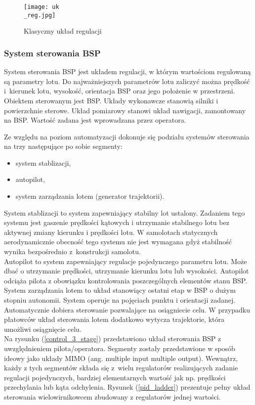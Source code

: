 \begin{figure}[!h]
   	\centering
      	\texttt{[image: uk\\\_reg.jpg]}
      	\caption{Klasyczny układ regulacji}
      	\label{reg}
\end{figure}

\subsubsection{System sterowania BSP}
System sterowania BSP jest układem regulacji, w którym wartościom regulowaną są parametry lotu. Do najważniejszych parametrów lotu zaliczyć można prędkość i~kierunek lotu, wysokość, orientacja BSP oraz jego położenie w przestrzeni. Obiektem sterowanym jest BSP. Układy wykonawcze stanowią silniki i powierzchnie sterowe. Układ pomiarowy stanowi układ nawigacji, zamontowany na BSP. Wartość zadana jest wprowadzana przez operatora.

 Ze względu na poziom automatyzacji dokonuje się podziału systemów sterowania na trzy następujące po sobie segmenty:
\begin{itemize}
\item system stablizacji,
\item autopilot,
\item system zarządzania lotem (generator trajektorii).
\end{itemize}
System stablizacji to system zapewniający stabilny lot ustalony. Zadaniem tego systemu jest gaszenie prędkości kątowych i utrzymanie stabilnego lotu bez aktywnej zmiany kierunku i prędkości lotu. W samolotach statycznych aerodynamicznie obecność tego systemu nie jest wymagana gdyż stabilność wynika bezpośrednio z~konstrukcji samolotu.\\

Autopilot to system zapewniający regulacje pojedynczego parametru lotu. Może dbać o utrzymanie prędkości, utrzymanie kierunku lotu lub wysokości. Autopilot odciąża pilota z obowiązku kontrolowania poszczególnych elementów stanu BSP.\\

System zarządzania lotem to układ stanowiący ostatni etap w BSP o dużym stopniu autonomii. System operuje na pojęciach punktu i orientacji zadanej. Automatycznie dobiera sterowanie pozwalające na osiągniecie celu. W przypadku płatowców układ sterowania lotem dodatkowo wytycza trajektorie, która umożliwi osiągnięcie celu.\\

Na rysunku (\ref{control_3_stage}) przedstawiono układ sterowania BSP z uwzględnieniem pilota/operatora. Segmenty zostały przedstawione w sposób ideowy jako układy MIMO (ang. multiple input multiple output). Wewnątrz, każdy z tych segmentów składa się z~wielu regulatorów realizujących zadanie regulacji pojedynczych, bardziej elementarnych wartość jak np. prędkości przechylania lub kąta odchylenia. Rysunek (\ref{pid_ladder}) prezentuje pełny układ sterowania wielowirnikowcem zbudowany z regulatorów jednej wartości.\\

